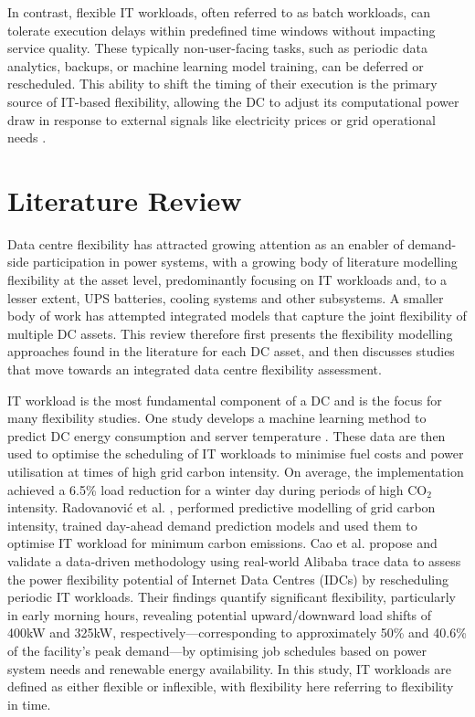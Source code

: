 \documentclass[lettersize,journal]{IEEEtran}
\newcommand{\rev}[1]{\textcolor{blue!70!black}{#1}}
\begin{document}
In contrast, flexible IT workloads, often referred to as batch workloads, can tolerate execution delays within predefined time windows without impacting service quality. These typically non-user-facing tasks, such as periodic data analytics, backups, or machine learning model training, can be deferred or rescheduled. This ability to shift the timing of their execution is the primary source of IT-based flexibility, allowing the DC to adjust its computational power draw in response to external signals like electricity prices or grid operational needs \cite{Cao2022ApEn}.

\section{Literature Review}

\rev{Data centre flexibility has attracted growing attention as an enabler of demand-side participation in power systems, with a growing body of literature modelling flexibility at the asset level, predominantly focusing on IT workloads and, to a lesser extent, UPS batteries, cooling systems and other subsystems. A smaller body of work has attempted integrated models that capture the joint flexibility of multiple DC assets. This review therefore first presents the flexibility modelling approaches found in the literature for each DC asset, and then discusses studies that move towards an integrated data centre flexibility assessment.}

IT workload is the most fundamental component of a DC and is the focus for many flexibility studies. One study develops a machine learning method to predict DC energy consumption and server temperature \cite{Misaghian2023TIA}. These data are then used to optimise the scheduling of IT workloads to minimise fuel costs and power utilisation at times of high grid carbon intensity. On average, the implementation achieved a 6.5\% load reduction for a winter day during periods of high CO$_2$ intensity. Radovanović et al. \cite{radovanovic2022carbon}, performed predictive modelling of grid carbon intensity, trained day-ahead demand prediction models and used them to optimise IT workload for minimum carbon emissions.
Cao et al. \cite{Cao2022ApEn} propose and validate a data-driven methodology using real-world Alibaba trace data to assess the power flexibility potential of Internet Data Centres (IDCs) by rescheduling periodic IT workloads. Their findings quantify significant flexibility, particularly in early morning hours, revealing potential upward/downward load shifts of 400kW and 325kW, respectively—corresponding to approximately 50\% and 40.6\% of the facility's peak demand—by optimising job schedules based on power system needs and renewable energy availability. In this study, IT workloads are defined as either flexible or inflexible, with flexibility here referring to flexibility in time.
\end{document}
